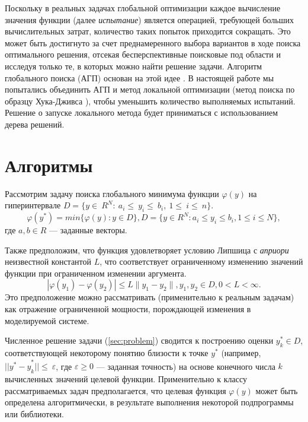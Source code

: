 \documentclass[runningheads]{llncs}
\begin{document}
Поскольку в реальных задачах глобальной оптимизации каждое вычисление значения функции (далее \textit{испытание}) является операцией, требующей больших вычислительных затрат, количество таких попыток приходится сокращать. Это может быть достигнуто за счет преднамеренного выбора вариантов в ходе поиска оптимального решения, отсекая бесперспективные поисковые под области и исследуя только те, в которых можно найти решение задачи. Алгоритм глобального поиска (АГП) основан на этой идее \cite{Strongin2000}. В настоящей работе мы попытались объединить АГП и метод локальной оптимизации \cite{Nocedal, Kelley}  (метод поиска по образцу Хука-Дживса \cite{HookJeeves}), чтобы уменьшить количество выполняемых испытаний. Решение о запуске локального метода будет приниматься с использованием дерева решений.

\section{Алгоритмы}\label{SecA}

Рассмотрим задачу поиска глобального минимума функции $\varphi(y)$ на гиперинтервале $D=\{ y\in\ R^N:\ a_i\le\ y_i\le\ b_i,\ 1\le\ i\le\ n \}$. 
\begin{equation} \label{sec:problem}   
	\varphi(y^*) = min\{\varphi(y):y\in D\}, D = \{y \in R^N : a_i \leq y_i \leq b_i, 1 \leq i \leq N \},
\end{equation}
где $a,b \in R$ — заданные векторы.

Также предположим, что функция удовлетворяет условию Липшица с \textit{априори} неизвестной константой $L$, что соответствует ограниченному изменению значений функции при ограниченном изменении аргумента.
\begin{displaymath} 
	|\varphi(y_1)-\varphi(y_2)|\leq L\parallel y_1-y_2 \parallel ,y_1,y_2 \in D, 0<L< \infty. 
\end{displaymath}
Это предположение можно рассматривать (применительно к реальным задачам) как отражение ограниченной мощности, порождающей изменения в моделируемой системе.

Численное решение задачи (\ref{sec:problem}) сводится к построению оценки $y_k^\ast\in D$, соответствующей некоторому понятию близости к точке $y^\ast$ (например, ${ ||y^\ast-y}_k^\ast||\le\ \varepsilon$, где $\varepsilon\geq0$ — заданная точность) на основе конечного числа $k$ вычисленных значений целевой функции. Применительно к классу рассматриваемых задач предполагается, что целевая функция $\varphi(y)$ может быть определена алгоритмически, в результате выполнения некоторой подпрограммы или библиотеки.
\end{document}
